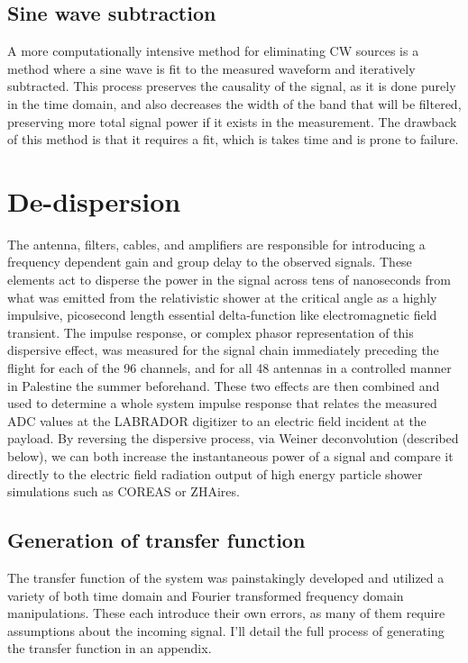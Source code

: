 		\subsection{Sine wave subtraction}
			A more computationally intensive method for eliminating CW sources is a method where a sine wave is fit to the measured waveform and iteratively subtracted.  This process preserves the causality of the signal, as it is done purely in the time domain, and also decreases the width of the band that will be filtered, preserving more total signal power if it exists in the measurement.  The drawback of this method is that it requires a fit, which is takes time and is prone to failure.


\section{De-dispersion}
	The antenna, filters, cables, and amplifiers are responsible for introducing a frequency dependent gain and group delay to the observed signals.  These elements act to disperse the power in the signal across tens of nanoseconds from what was emitted from the relativistic shower at the critical angle as a highly impulsive, picosecond length essential delta-function like electromagnetic field transient.  The impulse response, or complex phasor representation of this dispersive effect, was measured for the signal chain immediately preceding the flight for each of the 96 channels, and for all 48 antennas in a controlled manner in Palestine the summer beforehand.  These two effects are then combined and used to determine a whole system impulse response that relates the measured ADC values at the LABRADOR digitizer to an electric field incident at the payload.  By reversing the dispersive process, via Weiner deconvolution (described below), we can both increase the instantaneous power of a signal and compare it directly to the electric field radiation output of high energy particle shower simulations such as COREAS or ZHAires.
	\subsection{Generation of transfer function}
		The transfer function of the system was painstakingly developed and utilized a variety of both time domain and Fourier transformed frequency domain manipulations.  These each introduce their own errors, as many of them require assumptions about the incoming signal.  I'll detail the full process of generating the transfer function in an appendix.
